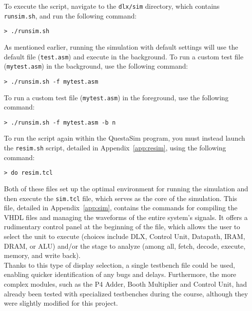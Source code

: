 To execute the script, navigate to the \texttt{dlx/sim} directory, which contains \texttt{runsim.sh}, and run the following command:
\begin{lstlisting}[style=MyShell]
 > ./runsim.sh
\end{lstlisting}

As mentioned earlier, running the simulation with default settings will use the default file (\texttt{test.asm}) and execute in the background. To run a custom test file (\texttt{mytest.asm}) in the background, use the following command:
\begin{lstlisting}[style=MyShell]
 > ./runsim.sh -f mytest.asm
\end{lstlisting}

To run a custom test file (\texttt{mytest.asm}) in the foreground, use the following command:
\begin{lstlisting}[style=MyShell]
 > ./runsim.sh -f mytest.asm -b n
\end{lstlisting}

To run the script again within the QuestaSim program, you must instead launch the \texttt{resim.sh} script, detailed in Appendix~\ref{app:resim}, using the following command:
\begin{lstlisting}[style=MyShell]
 > do resim.tcl
\end{lstlisting}

Both of these files set up the optimal environment for running the simulation and then execute the \texttt{sim.tcl} file, which serves as the core of the simulation. This file, detailed in Appendix~\ref{app:sim}, contains the commands for compiling the VHDL files and managing the waveforms of the entire system's signals. It offers a rudimentary control panel at the beginning of the file, which allows the user to select the unit to execute (choices include DLX, Control Unit, Datapath, IRAM, DRAM, or ALU) and/or the stage to analyze (among all, fetch, decode, execute, memory, and write back). \\

Thanks to this type of display selection, a single testbench file could be used, enabling quicker identification of any bugs and delays. Furthermore, the more complex modules, such as the P4 Adder, Booth Multiplier and Control Unit, had already been tested with specialized testbenches during the course, although they were slightly modified for this project.
